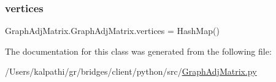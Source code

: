 \hypertarget{class_graph_adj_matrix_1_1_graph_adj_matrix_a85c454d09e82706b00563af339c0147f}{}\label{class_graph_adj_matrix_1_1_graph_adj_matrix_a85c454d09e82706b00563af339c0147f} 
\subsubsection{\texorpdfstring{vertices}{vertices}}
{\footnotesize\ttfamily Graph\+Adj\+Matrix.\+Graph\+Adj\+Matrix.\+vertices = Hash\+Map()\hspace{0.3cm}{\ttfamily [static]}}



The documentation for this class was generated from the following file\+:\begin{DoxyCompactItemize}
\item 
/\+Users/kalpathi/gr/bridges/client/python/src/\hyperlink{_graph_adj_matrix_8py}{Graph\+Adj\+Matrix.\+py}\end{DoxyCompactItemize}

